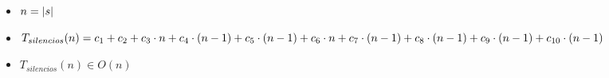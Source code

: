 \documentclass{article}
\begin{document}
    \begin{itemize}
        \item $n = |s|$
        \item $T_{silencios}(n) = c_1 +
                                  c_2 +
                                  c_3 \cdot n +
                                  c_4 \cdot (n-1) +
                                  c_5 \cdot (n-1) +
                                  c_6 \cdot n +
                                  c_7 \cdot (n-1) +
                                  c_8 \cdot (n-1) +
                                  c_9 \cdot (n-1) + \\
                                  c_{10} \cdot (n-1)$
        \item $T_{silencios}(n) \in O(n)$
    \end{itemize}
\end{document}
